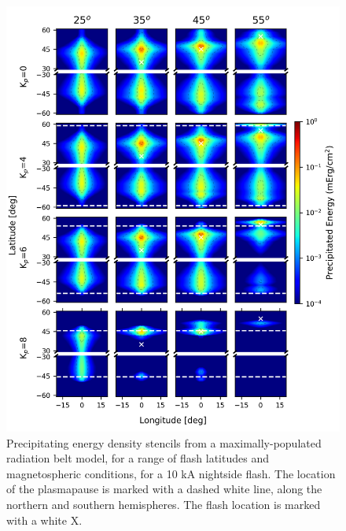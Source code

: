\begin{figure}[]
\begin{center}
\includegraphics{figures/energy_stencils_nightside_v2.png}
\caption[Precipitating flux density stencils for a range of input latitudes and magnetospheric conditions (nightside)]{Precipitating energy density stencils from a maximally-populated radiation belt model, for a range of flash latitudes and magnetospheric conditions, for a 10 kA nightside flash. The location of the plasmapause is marked with a dashed white line, along the northern and southern hemispheres. The flash location is marked with a white X.}
\label{fig:precip_stencils}
\end{center}
\end{figure}

